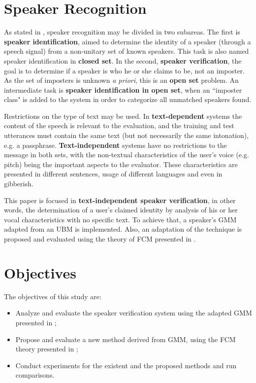 \section{Speaker Recognition}

As stated in \autocite{pinheiro.2013}, speaker recognition may be divided in two subareas. The first is \textbf{speaker identification}, aimed to determine the identity of a speaker (through a speech signal) from a non-unitary set of known speakers. This task is also named speaker identification in \textbf{closed set}. In the second, \textbf{speaker verification}, the goal is to determine if a speaker is who he or she claims to be, not an imposter. As the set of imposters is unknown \emph{a priori}, this is an \textbf{open set} problem. An intermediate task is \textbf{speaker identification in open set}, when an ``imposter class" is added to the system in order to categorize all unmatched speakers found.

Restrictions on the type of text may be used. In \textbf{text-dependent} systems the content of the speech is relevant to the evaluation, and the training and test utterances must contain the same text (but not necessarily the same intonation), e.g. a passphrase. \textbf{Text-independent} systems have no restrictions to the message in both sets, with the non-textual characteristics of the user's voice (e.g. pitch) being the important aspects to the evaluator. These characteristics are presented in different sentences, usage of different languages and even in gibberish.

This paper is focused in \textbf{text-independent speaker verification}, in other words, the determination of a user's claimed identity by analysis of his or her vocal characteristics with no specific text. To achieve that, a speaker's GMM adapted from an UBM \autocite{reynolds.quatieri.dunn.2000} is implemented. Also, an adaptation of the technique is proposed and evaluated using the theory of FCM presented in \autocite{gao.zhou.pu.2013}.

\section{Objectives}

The objectives of this study are:

\begin{itemize}\itemsep0pt
    \item Analyze and evaluate the speaker verification system using the adapted GMM presented in \autocite{reynolds.quatieri.dunn.2000};
    \item Propose and evaluate a new method derived from GMM, using the FCM theory presented in \autocite{gao.zhou.pu.2013};
    \item Conduct experiments for the existent and the proposed methods and run comparisons.
\end{itemize}

